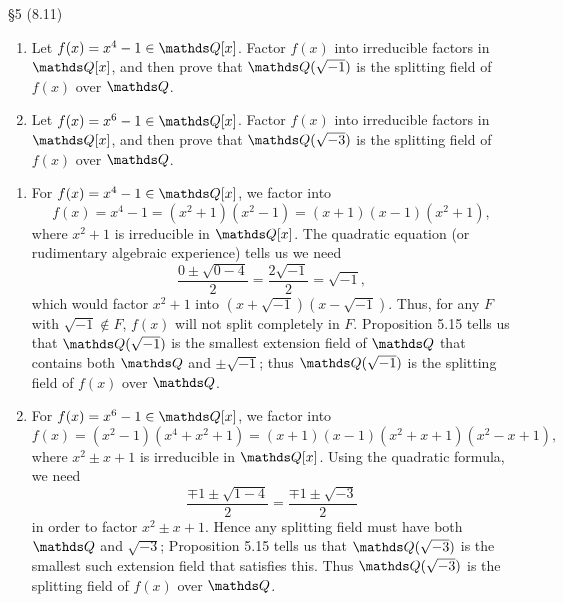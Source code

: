 \documentclass{homework}
\begin{document}
\begin{problem}{\S 5}
  (8.11)
  \begin{enumerate}[label=(\alph*)]
    \item Let $f(x)=x^{4}-1\in \Q[x]$. Factor $f(x)$ into irreducible factors in $\Q[x]$, and then
      prove that $\Q(\sqrt{-1})$ is the splitting field of $f(x)$ over $\Q$.
    \item Let $f(x)=x^6-1\in \Q[x]$. Factor $f(x)$ into irreducible factors in $\Q[x]$, and then
      prove that $\Q(\sqrt{-3})$ is the splitting field of $f(x)$ over $\Q$.
  \end{enumerate}
\end{problem}
\begin{solution}
  \begin{enumerate}[label=(\alph*)]
    \item For $f(x)=x^4-1\in \Q[x]$, we factor into \[
        f(x)=x^4-1=(x^2+1)(x^2-1)=(x+1)(x-1)(x^2+1)
        ,\] where $x^2+1$ is irreducible in $\Q[x]$. The quadratic equation (or rudimentary
        algebraic experience) tells us we need \[
        \frac{0\pm \sqrt{0-4}}{2}=\frac{2\sqrt{-1}}{2}=\sqrt{-1}
      ,\] which would factor $x^2+1$ into $(x+\sqrt{-1})(x-\sqrt{-1})$. Thus, for any $F$ with
      $\sqrt{-1}\not\in F$, $f(x)$ will not split completely in $F$. Proposition 5.15 tells us that
      $\Q(\sqrt{-1})$ is the smallest extension field of $\Q$ that contains both $\Q$ and $\pm
      \sqrt{-1}$; thus $\Q(\sqrt{-1})$ is the splitting field of $f(x)$ over $\Q$.
    \item For $f(x)=x^6-1\in \Q[x]$, we factor into \[
        f(x)=(x^2-1)(x^4+x^2+1)=(x+1)(x-1)(x^2+x+1)(x^2-x+1)
      ,\] where $x^2\pm x+1$ is irreducible in $\Q[x]$. Using the quadratic formula, we need \[
        \frac{\mp 1\pm \sqrt{1-4}}{2}=\frac{\mp 1\pm \sqrt{-3}}{2}
      \] in order to factor $x^2\pm x+1$. Hence any splitting field must have both $\Q$ and
      $\sqrt{-3}$; Proposition 5.15 tells us that $\Q(\sqrt{-3})$ is the smallest such extension
      field that satisfies this. Thus $\Q(\sqrt{-3})$ is the splitting field of $f(x)$ over $\Q$.
  \end{enumerate}
\end{solution} 
\end{document}
